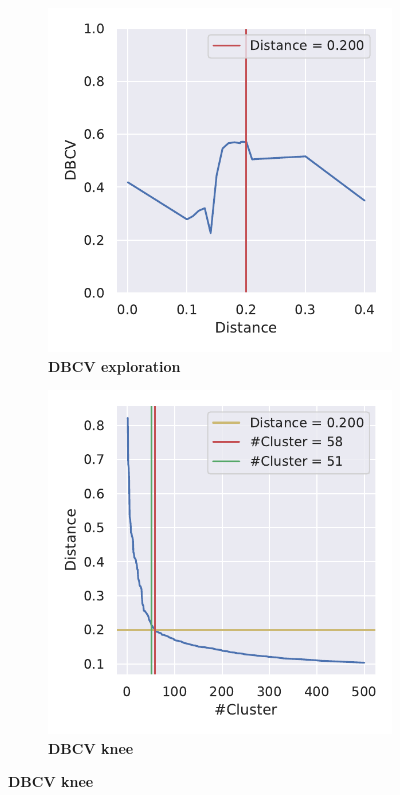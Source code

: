 \begin{figure}[!htb]
    \centering
    \begin{subfigure}[b]{0.475\textwidth}
        \caption[DBCV exploration]{\textbf{DBCV exploration}}
        \label{subfig:PCA_Cluster_DBCV_Explo_4}            \includegraphics[width=\textwidth]{PCA/Cluster_DBCV_Segment_4.pdf}
    \end{subfigure}
    \hfill
    \begin{subfigure}[b]{0.475\textwidth}
        \caption[DBCV knee]{\textbf{DBCV knee}}
        \label{subfig:PCA_Cluster_DBCV_Elbow_4}            \includegraphics[width=\textwidth]{PCA/Cluster_Elbow_DBCV_Segment_4.pdf}

\end{subfigure}
\end{figure}
